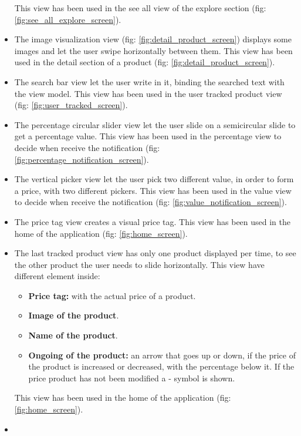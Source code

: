 \begin{itemize}
{        This view has been used  in the see all view of the explore section (fig: \ref{fig:see_all_explore_screen}).
    }
    \item {
        The image visualization view (fig: \ref{fig:detail_product_screen}) displays some images and let the user swipe horizontally between them.
        This view has been used in the detail section of a product (fig: \ref{fig:detail_product_screen}).
    }
    \item {
        The search bar view let the user write in it, binding the searched text with the view model.
        This view has been used in the user tracked product view (fig: \ref{fig:user_tracked_screen}).
    }
    \item {
        The percentage circular slider view let the user slide on a semicircular slide to get a percentage value.
        This view has been used in the percentage view to decide when receive the notification (fig: \ref{fig:percentage_notification_screen}).
    }
    \item {
        The vertical picker view let the user pick two different value, in order to form a price, with two different pickers.
        This view has been used in the value view to decide when receive the notification (fig: \ref{fig:value_notification_screen}).
    }
    \item {
        The price tag view creates a visual price tag.
        This view has been used in the home of the application (fig: \ref{fig:home_screen}).
    }
    \item {
        The last tracked product view has only one product displayed per time, to see the other product the user needs to slide horizontally.
        This view have different element inside:
        \begin{itemize}
            \item \textbf{Price tag:} with the actual price of a product.
            \item \textbf{Image of the product}. 
            \item \textbf{Name of the product}.
            \item \textbf{Ongoing of the product:} an arrow that goes up or down, if the price of the product is increased or decreased, with the percentage below it. If the price product has not been modified a - symbol is shown.
        \end{itemize}
        This view has been used in the home of the application (fig: \ref{fig:home_screen}).
    }
    \item {
}
\end{itemize}
